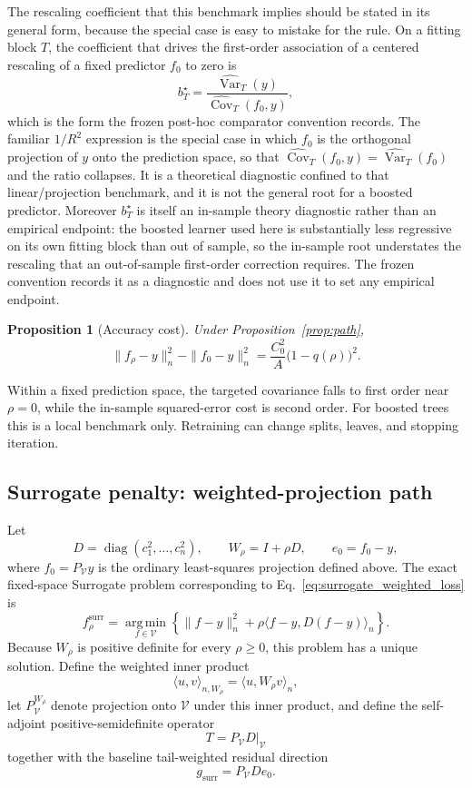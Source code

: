 \documentclass[10pt]{article}
\newtheorem{proposition}{Proposition}
\theoremstyle{definition}
\newcommand{\Cov}{\operatorname{Cov}}
\newcommand{\Var}{\operatorname{Var}}
\newcommand{\diag}{\operatorname{diag}}
\newcommand{\1}{\mathbf{1}}
\newcommand{\Vcal}{\mathcal{V}}
\newcommand{\argminop}{\operatorname*{arg\,min}}
\begin{document}
The rescaling coefficient that this benchmark implies should be stated in its
general form, because the special case is easy to mistake for the rule. On a fitting block
$T$, the coefficient that drives the first-order association of a centered rescaling of a
fixed predictor $f_0$ to zero is
\[
b^{\star}_{T}
=
\frac{\widehat{\Var}_{T}(y)}{\widehat{\Cov}_{T}(f_0,y)},
\]
which is the form the frozen post-hoc comparator convention records. The familiar
$1/R^{2}$ expression is the special case in which $f_0$ is the orthogonal projection of
$y$ onto the prediction space, so that $\widehat{\Cov}_{T}(f_0,y)=\widehat{\Var}_{T}(f_0)$
and the ratio collapses. It is a theoretical diagnostic confined to that
linear/projection benchmark, and it is not the general root for a boosted predictor.
Moreover $b^{\star}_{T}$ is itself an in-sample theory diagnostic rather than an empirical
endpoint: the boosted learner used here is substantially less regressive on its own
fitting block than out of sample, so the in-sample root understates the rescaling that an
out-of-sample first-order correction requires. The frozen convention records it as a
diagnostic and does not use it to set any empirical endpoint.

\begin{proposition}[Accuracy cost]
\label{prop:path_cost}
Under Proposition~\ref{prop:path},
\[
\|f_\rho-y\|_n^2-\|f_0-y\|_n^2
=
\frac{C_0^2}{A}\bigl(1-q(\rho)\bigr)^2.
\]
\end{proposition}

Within a fixed prediction space, the targeted covariance falls to first order near $\rho=0$, while the in-sample squared-error cost is second order. For boosted trees this is a local benchmark only. Retraining can change splits, leaves, and stopping iteration.

\subsection{Surrogate penalty: weighted-projection path}

{Let
\[
D=\diag(c_1^2,\ldots,c_n^2),
\qquad
W_\rho=I+\rho D,
\qquad
e_0=f_0-y,
\]
where $f_0=P_{\Vcal}y$ is the ordinary least-squares projection defined above. The exact fixed-space Surrogate problem corresponding to Eq.~\eqref{eq:surrogate_weighted_loss} is
\begin{equation}
\label{eq:surrogate_fixed_space_problem}
f_\rho^{\mathrm{surr}}
=
\argminop_{f\in\Vcal}
\left\{
\|f-y\|_n^2
+
\rho\langle f-y,D(f-y)\rangle_n
\right\}.
\end{equation}
Because $W_\rho$ is positive definite for every $\rho\geq0$, this problem has a unique solution. Define the weighted inner product
\[
\langle u,v\rangle_{n,W_\rho}
=
\langle u,W_\rho v\rangle_n,
\]
let $P_{\Vcal}^{W_\rho}$ denote projection onto $\Vcal$ under this inner product, and define the self-adjoint positive-semidefinite operator
\[
T=P_{\Vcal}D\big|_{\Vcal}
\]
together with the baseline tail-weighted residual direction
\[
g_{\mathrm{surr}}
=
P_{\Vcal}De_0.
\]}
\end{document}
